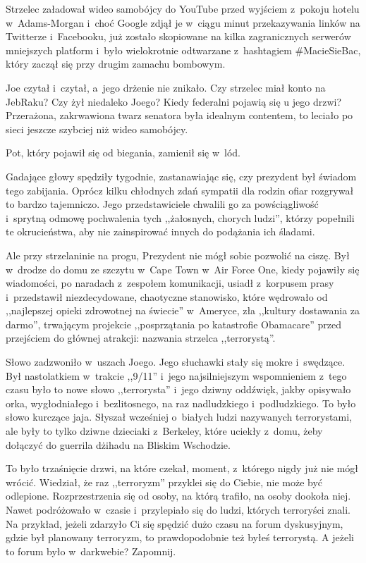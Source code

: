 \documentclass[oneside,polish,11pt,sfheadings]{mwbk}
\begin{document}
Strzelec załadował wideo samobójcy do YouTube przed wyjściem z~pokoju
hotelu w~Adams-Morgan i~choć Google zdjął je w~ciągu minut przekazywania
linków na Twitterze i~Facebooku, już zostało skopiowane na kilka
zagranicznych serwerów mniejszych platform i~było wielokrotnie
odtwarzane z~hashtagiem \#MacieSieBac, który zaczął się przy drugim
zamachu bombowym.

Joe czytał i~czytał, a~jego drżenie nie znikało. Czy strzelec miał konto
na JebRaku? Czy żył niedaleko Joego? Kiedy federalni pojawią się u jego
drzwi? Przerażona, zakrwawiona twarz senatora była idealnym contentem,
to leciało po sieci jeszcze szybciej niż wideo samobójcy.

Pot, który pojawił się od biegania, zamienił się w~lód.

Gadające głowy spędziły tygodnie, zastanawiając się, czy prezydent był
świadom tego zabijania. Oprócz kilku chłodnych zdań sympatii dla rodzin
ofiar rozgrywał to bardzo tajemniczo. Jego przedstawiciele chwalili go
za powściągliwość i~sprytną odmowę pochwalenia tych ,,żałosnych, chorych
ludzi'', którzy popełnili te okrucieństwa, aby nie zainspirować innych
do podążania ich śladami.

Ale przy strzelaninie na progu, Prezydent nie mógł sobie pozwolić na
ciszę. Był w~drodze do domu ze szczytu w~Cape Town w~Air Force One,
kiedy pojawiły się wiadomości, po naradach z~zespołem komunikacji,
usiadł z~korpusem prasy i~przedstawił niezdecydowane, chaotyczne
stanowisko, które wędrowało od ,,najlepszej opieki zdrowotnej na
świecie'' w~Ameryce, zła ,,kultury dostawania za darmo'', trwającym
projekcie ,,posprzątania po katastrofie Obamacare'' przed przejściem do
głównej atrakcji: nazwania strzelca ,,terrorystą''.

Słowo zadzwoniło w~uszach Joego. Jego słuchawki stały się mokre i~swędzące. Był nastolatkiem w~trakcie ,,9/11'' i~jego najsilniejszym
wspomnieniem z~tego czasu było to nowe słowo ,,terrorysta'' i~jego
dziwny oddźwięk, jakby opisywało orka, wygłodniałego i~bezlitosnego, na
raz nadludzkiego i~podludzkiego. To było słowo kurczące jaja. Słyszał
wcześniej o~białych ludzi nazywanych terrorystami, ale były to tylko
dziwne dzieciaki z~Berkeley, które uciekły z~domu, żeby dołączyć do
guerrila dżihadu na Bliskim Wschodzie.

To było trzaśnięcie drzwi, na które czekał, moment, z~którego nigdy już
nie mógł wrócić. Wiedział, że raz ,,terroryzm'' przyklei się do Ciebie,
nie może być odlepione. Rozprzestrzenia się od osoby, na którą trafiło,
na osoby dookoła niej. Nawet podróżowało w~czasie i~przylepiało się do
ludzi, których terroryści znali. Na przykład, jeżeli zdarzyło Ci się
spędzić dużo czasu na forum dyskusyjnym, gdzie był planowany terroryzm,
to prawdopodobnie też byłeś terrorystą. A jeżeli to forum było w~darkwebie? Zapomnij.
\end{document}
